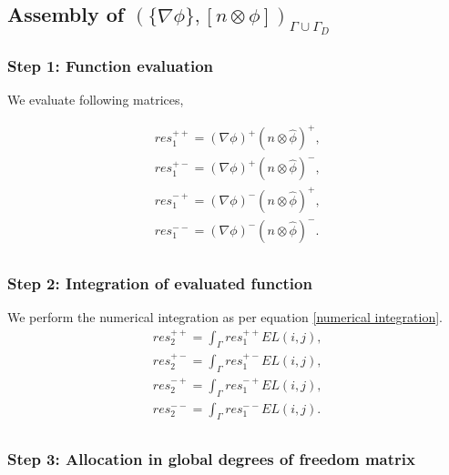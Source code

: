 \documentclass[a4paper,twoside,openright]{book}
\begin{document}
\subsection{Assembly of $(\lbrace \nabla \phi \rbrace, [n \otimes \phi])_{\Gamma \cup \Gamma_D}$}

\subsubsection{Step 1: Function evaluation}

We evaluate following matrices,

\begin{equation}
\begin{split}
res_1^{++} = (\nabla \phi)^+ (n \otimes \hat{\phi})^+ \textrm{,}\\
res_1^{+-} = (\nabla \phi)^+ (n \otimes \hat{\phi})^- \textrm{,}\\
res_1^{-+} = (\nabla \phi)^- (n \otimes \hat{\phi})^+ \textrm{,}\\
res_1^{--} = (\nabla \phi)^- (n \otimes \hat{\phi})^- \textrm{.}\\
\end{split}
\end{equation}

\subsubsection{Step 2: Integration of evaluated function}

We perform the numerical integration as per equation \eqref{numerical integration}.
\begin{equation}
\begin{split}
res_2^{++} = \int_{\Gamma} res_1^{++} EL(i,j) \textrm{,}\\
res_2^{+-} = \int_{\Gamma} res_1^{+-} EL(i,j) \textrm{,}\\
res_2^{-+} = \int_{\Gamma} res_1^{-+} EL(i,j) \textrm{,}\\
res_2^{--} = \int_{\Gamma} res_1^{--} EL(i,j) \textrm{.}\\
\end{split}
\end{equation}

\subsubsection{Step 3: Allocation in global degrees of freedom matrix}
\end{document}
